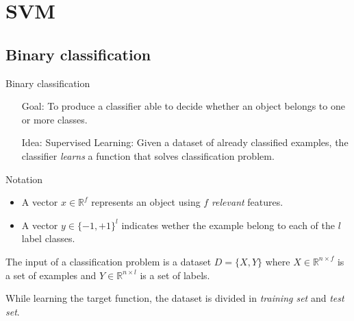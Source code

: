 \section{SVM}
\subsection{Binary classification}
\begin{frame}{Binary classification}
	\begin{itemize}\setlength\itemsep{1em}
		\item[Goal:] To produce a classifier able to decide whether an object belongs to one or more classes.
		\item[Idea:] Supervised Learning: Given a dataset of already classified examples, the classifier \textit{learns} a function that solves classification problem.
	\end{itemize}
\end{frame}

\begin{frame}{Notation}
	\begin{itemize}\setlength\itemsep{1em}
		\item A vector $x \in \mathbb{R}^f$ represents an object using $f$ \textit{relevant} features.
		\item A vector $y \in \{-1 , +1\}^l$ indicates wether the example belong to each of the $l$ label classes.
	\end{itemize}
	The input of a classification problem is a dataset $D = \{X, Y\}$ where $X \in \mathbb{R}^{n\times f}$ is a set of examples and $Y \in \mathbb{R}^{n\times l}$ is a set of labels.
	
	While learning the target function, the dataset is divided in \textit{training set} and \textit{test set}.
\end{frame}

